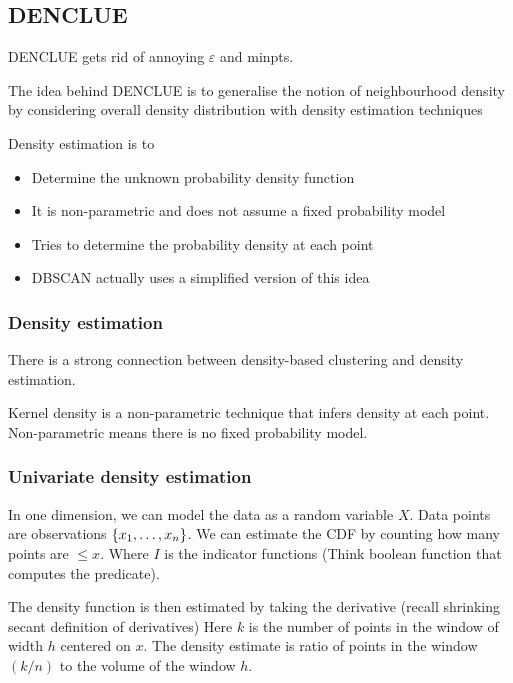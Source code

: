 \subsection{DENCLUE}
    DENCLUE gets rid of annoying $\varepsilon$ and minpts.
    
    The idea behind DENCLUE is to generalise the notion of neighbourhood density by considering overall density distribution with density estimation techniques
    
    Density estimation is to 
    \begin{itemize}
        \item Determine the unknown probability density function
        \item It is non-parametric and does not assume a fixed probability model
        \item Tries to determine the probability density at each point
        \item DBSCAN actually uses a simplified version of this idea
    \end{itemize}
    
\subsubsection{Density estimation}
There is a strong connection between density-based clustering and density estimation. 

Kernel density is a non-parametric technique that infers density at each point. Non-parametric means there is no fixed probability model.

\subsubsection{Univariate density estimation}
    In one dimension, we can model the data as a random variable $X$. Data points are observations $\{x_1, \dots, x_n\}$. We can estimate the CDF by counting how many points are $\leq x$. 
    Where $I$ is the indicator functions (Think boolean function that computes the predicate).
    
    The density function is then estimated by taking the derivative (recall shrinking secant definition of derivatives)
    Here $k$ is the number of points in the window of width $h$ centered on $x$. The density estimate is ratio of points in the window $(k/n)$ to the volume of the window $h$.
    
